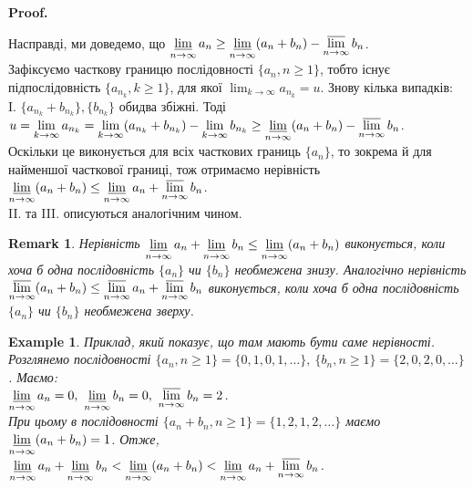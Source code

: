 \documentclass[a4paper, 14pt]{article}
\makeatletter
\def\qed{$\blacksquare$}
\theoremstyle{theoremdd}
\theoremstyle{theoremdd}
\theoremstyle{theoremdd}
\theoremstyle{theoremdd}
\newtheorem{example}[theorem]{Example}
\theoremstyle{theoremdd}
\theoremstyle{theoremdd}
\newtheorem{remark}[theorem]{Remark}
\theoremstyle{theoremdd}
\theoremstyle{theoremdd}
\renewenvironment{proof}[1][Proof.\\]{\par
\pushQED{\hfill \qed}%
\normalfont \topsep6\p@\@plus6\p@\relax
\trivlist
\item\relax
{\bfseries
#1\@addpunct{.}}\hspace\labelsep\ignorespaces
}{%
\popQED\endtrivlist\@endpefalse
}
\makeatother
\begin{document}
\begin{proof}
	Насправді, ми доведемо, що $\displaystyle\varliminf_{n \to \infty} a_n \geq \varliminf_{n \to \infty} (a_n + b_n) - \varlimsup_{n \to \infty} b_n$.\\
	Зафіксуємо часткову границю послідовності $\{a_n, n \geq 1\}$, тобто існує підпослідовність $\{a_{n_k}, k \geq 1\}$, для якої $\displaystyle\lim_{k \to \infty} a_{n_k} = u$. Знову кілька випадків:\\
	I. $\{a_{n_k} + b_{n_k}\}, \{b_{n_k}\}$ обидва збіжні. Тоді $u = \displaystyle\lim_{k \to \infty} a_{n_k} = \lim_{k \to \infty} (a_{n_k} + b_{n_k}) - \lim_{k \to \infty} b_{n_k} \geq \varliminf_{n \to \infty} (a_n + b_n) - \varlimsup_{n \to \infty} b_n$.\\
	Оскільки це виконується для всіх часткових границь $\{a_n\}$, то зокрема й для найменшої часткової границі, тож отримаємо нерівність $\displaystyle\varliminf_{n \to \infty} (a_n + b_n) \leq \varliminf_{n \to \infty} a_n + \varlimsup_{n \to \infty} b_n$.\\
	II. та III. описуються аналогічним чином.
	\end{proof}
	
	\begin{remark}
	Нерівність $\displaystyle\varliminf_{n \to \infty} a_n + \varliminf_{n \to \infty} b_n \leq \varliminf_{n \to \infty} (a_n + b_n)$ виконується, коли хоча б одна послідовність $\{a_n\}$ чи $\{b_n\}$ необмежена знизу. Аналогічно нерівність $\displaystyle\varlimsup_{n \to \infty} (a_n + b_n) \leq \varlimsup_{n \to \infty} a_n + \varlimsup_{n \to \infty} b_n$ виконується, коли хоча б одна послідовність $\{a_n\}$ чи $\{b_n\}$ необмежена зверху.
	\end{remark}
	
	\begin{example}
	Приклад, який показує, що там мають бути саме нерівності. Розглянемо послідовності $\{a_n, n \geq 1\} = \{0,1,0,1,\dots \},\ \{b_n, n \geq 1\} = \{2,0,2,0,\dots \}$. Маємо:\\
	$\displaystyle\varliminf_{n \to \infty} a_n = 0,\ \varliminf_{n \to \infty} b_n = 0,\ \varlimsup_{n \to \infty} b_n = 2$.\\
	При цьому в послідовності $\{a_n+b_n, n \geq 1\} = \{1,2,1,2,\dots\}$ маємо $\displaystyle\varliminf_{n \to \infty} (a_n+b_n) = 1$. Отже,\\
	$\displaystyle \varliminf_{n \to \infty} a_n + \varliminf_{n \to \infty} b_n < \varliminf_{n \to \infty} (a_n+b_n) < \varliminf_{n \to \infty} a_n + \varlimsup_{n \to \infty} b_n$.
	\end{example}
	
\end{document}
